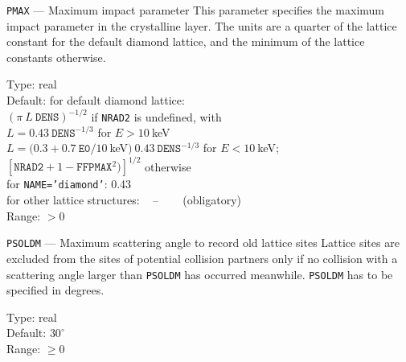 \begin{keydescription}{\texttt{PMAX} --- Maximum impact parameter}
%
This parameter specifies the maximum impact parameter in the crystalline
layer. The units are a quarter of the lattice
constant for the default diamond lattice, and the minimum of the lattice
constants otherwise. 
\begin{keytab}
   Type:    \> real \\
   Default: \> for default diamond lattice: \\
            \>$(\pi~L~\texttt{DENS})^{-1/2}$ if \texttt{NRAD2} is undefined, with\\
            \> $L = 0.43~\texttt{DENS}^{-1/3}$ for $E>10~$keV \\
            \> $L = (0.3+0.7~\texttt{E0}/10~$keV$)~0.43~\texttt{DENS}^{-1/3}$
               for $E<10~$keV; \\
            \> $[\texttt{NRAD2}+1-\texttt{FFPMAX}^2)]^{1/2}$ 
               otherwise \\
            \> for \texttt{NAME='diamond'}: 0.43 \\
            \> for other lattice structures: ~ -- ~~~ (obligatory) \\
   Range:   \> $>0$
\end{keytab}
\end{keydescription}

\begin{keydescription}{\texttt{PSOLDM} --- Maximum scattering angle to record 
old lattice sites}
%
Lattice sites are excluded from the sites of potential collision 
partners only if no collision with a scattering angle larger than 
\texttt{PSOLDM} has occurred meanwhile. \texttt{PSOLDM} has to be specified in 
degrees.
\begin{keytab}
   Type:    \> real \\
   Default: \> $30^\circ$ \\
   Range:   \> $\ge 0$
\end{keytab}
\end{keydescription}

